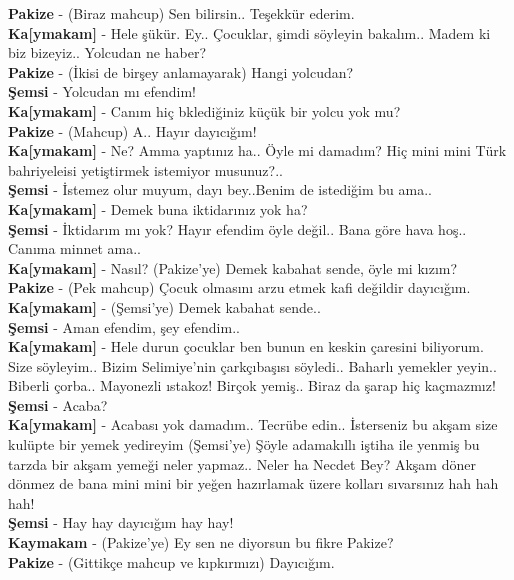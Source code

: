 \documentclass[]{book}
\begin{document}
\textbf{Pakize} - (Biraz mahcup) Sen bilirsin.. Teşekkür ederim.\\
\textbf{Ka{[}ymakam{]}} - Hele şükür. Ey.. Çocuklar, şimdi söyleyin bakalım.. Madem ki biz bizeyiz.. Yolcudan ne haber?\\
\textbf{Pakize} - (İkisi de birşey anlamayarak) Hangi yolcudan?\\
\textbf{Şemsi} - Yolcudan mı efendim!\\
\textbf{Ka{[}ymakam{]}} - Canım hiç bklediğiniz küçük bir yolcu yok mu?\\
\textbf{Pakize} - (Mahcup) A.. Hayır dayıcığım!\\
\textbf{Ka{[}ymakam{]}} - Ne? Amma yaptınız ha.. Öyle mi damadım? Hiç mini mini Türk bahriyeleisi yetiştirmek istemiyor musunuz?..\\
\textbf{Şemsi} - İstemez olur muyum, dayı bey..Benim de istediğim bu ama..\\
\textbf{Ka{[}ymakam{]}} - Demek buna iktidarınız yok ha?\\
\textbf{Şemsi} - İktidarım mı yok? Hayır efendim öyle değil.. Bana göre hava hoş.. Canıma minnet ama..\\
\textbf{Ka{[}ymakam{]}} - Nasıl? (Pakize'ye) Demek kabahat sende, öyle mi kızım?\\
\textbf{Pakize} - (Pek mahcup) Çocuk olmasını arzu etmek kafi değildir dayıcığım.\\
\textbf{Ka{[}ymakam{]}} - (Şemsi'ye) Demek kabahat sende..\\
\textbf{Şemsi} - Aman efendim, şey efendim..\\
\textbf{Ka{[}ymakam{]}} - Hele durun çocuklar ben bunun en keskin çaresini biliyorum. Size söyleyim.. Bizim Selimiye'nin çarkçıbaşısı söyledi.. Baharlı yemekler yeyin.. Biberli çorba.. Mayonezli ıstakoz! Birçok yemiş.. Biraz da şarap hiç kaçmazmız!\\
\textbf{Şemsi} - Acaba?\\
\textbf{Ka{[}ymakam{]}} - Acabası yok damadım.. Tecrübe edin.. İsterseniz bu akşam size kulüpte bir yemek yedireyim (Şemsi'ye) Şöyle adamakıllı iştiha ile yenmiş bu tarzda bir akşam yemeği neler yapmaz.. Neler ha Necdet Bey? Akşam döner dönmez de bana mini mini bir yeğen hazırlamak üzere kolları sıvarsınız hah hah hah!\\
\textbf{Şemsi} - Hay hay dayıcığım hay hay!\\
\textbf{Kaymakam} - (Pakize'ye) Ey sen ne diyorsun bu fikre Pakize?\\
\textbf{Pakize} - (Gittikçe mahcup ve kıpkırmızı) Dayıcığım.\\
\end{document}
